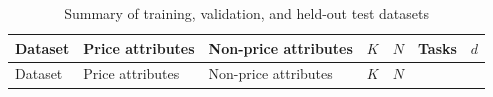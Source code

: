 \documentclass[
  11pt,
  letterpaper,
]{article}
\begin{document}
\begin{longtable}[]{@{}
  >{\raggedright\arraybackslash}p{}
  >{\raggedright\arraybackslash}p{}
  >{\raggedright\arraybackslash}p{}
  >{\raggedleft\arraybackslash}p{}
  >{\raggedleft\arraybackslash}p{}
  >{\raggedleft\arraybackslash}p{}
  >{\raggedleft\arraybackslash}p{}@{}}
\caption{Summary of training, validation, and held-out test
datasets}\label{tbl-datasets}\tabularnewline
\toprule\noalign{}
\begin{minipage}[b]{\linewidth}\raggedright
Dataset
\end{minipage} & \begin{minipage}[b]{\linewidth}\raggedright
Price attributes
\end{minipage} & \begin{minipage}[b]{\linewidth}\raggedright
Non-price attributes
\end{minipage} & \begin{minipage}[b]{\linewidth}\raggedleft
\(K\)
\end{minipage} & \begin{minipage}[b]{\linewidth}\raggedleft
\(N\)
\end{minipage} & \begin{minipage}[b]{\linewidth}\raggedleft
Tasks
\end{minipage} & \begin{minipage}[b]{\linewidth}\raggedleft
\(d\)
\end{minipage} \\
\midrule\noalign{}
\endfirsthead
\toprule\noalign{}
\begin{minipage}[b]{\linewidth}\raggedright
Dataset
\end{minipage} & \begin{minipage}[b]{\linewidth}\raggedright
Price attributes
\end{minipage} & \begin{minipage}[b]{\linewidth}\raggedright
Non-price attributes
\end{minipage} & \begin{minipage}[b]{\linewidth}\raggedleft
\(K\)
\end{minipage} & \begin{minipage}[b]{\linewidth}\raggedleft
\(N\)
\end{minipage} & \begin{minipage}[b]{\linewidth}\raggedleft

\end{minipage}
\end{longtable}
\end{document}
